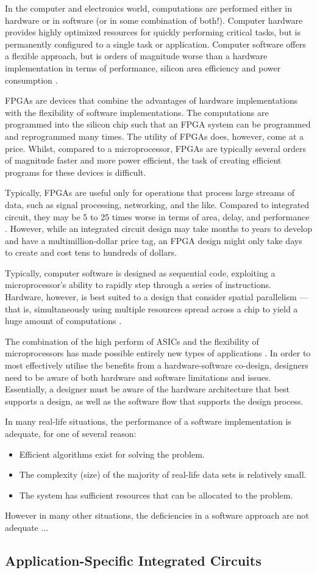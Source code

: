 In the computer and electronics world, computations are performed either in
hardware or in software (or in some combination of both!). Computer hardware
provides highly optimized resources for quickly performing critical tasks, but
is permanently configured to a single task or application. Computer software
offers a flexible approach, but is orders of magnitude worse than a hardware
implementation in terms of performance, silicon area efficiency and power
consumption \cite{Hauck:2007}.

\glspl{FPGA} are devices that combine the advantages of hardware implementations
with the flexibility of software implementations. The computations are
programmed into the silicon chip such that an FPGA system can be programmed and
reprogrammed many times. The utility of FPGAs does, however, come at a price.
Whilst, compared to a microprocessor, FPGAs are typically several orders of
magnitude faster and more power efficient, the task of creating efficient
programs for these devices is difficult.

Typically, \glspl{FPGA} are useful only for operations that process large
streams of data, such as signal processing, networking, and the like. Compared
to integrated circuit, they may be 5 to 25 times worse in terms of area, delay,
and performance \cite{Hauck:2007}. However, while an integrated circuit design
may take months to years to develop and have a multimillion-dollar price tag, an
\gls{FPGA} design might only take days to create and cost tens to hundreds of
dollars.

Typically, computer software is designed as sequential code, exploiting a
microprocessor's ability to rapidly step through a series of instructions.
Hardware, however, is best suited to a design that consider spatial parallelism
--- that is, simultaneously using multiple resources spread across a chip to
yield a huge amount of computations \cite{Hauck:2007}.

The combination of the high perform of \glspl{ASIC} and the flexibility of
microprocessors has made possible entirely new types of applications
\cite{Hauck:2007}. In order to most effectively utilise the benefits from a
hardware-software co-design, designers need to be aware of both hardware and
software limitations and issues. Essentially, a designer must be aware of the
hardware architecture that best supports a design, as well as the software flow
that supports the design process.

In many real-life situations, the performance of a software implementation is
adequate, for one of several reason:
\begin{itemize}
    \item Efficient algorithms exist for solving the problem.
    \item The complexity (size) of the majority of real-life data sets is
        relatively small.
    \item The system has sufficient resources that can be allocated to the
        problem.
\end{itemize}

However in many other situations, the deficiencies in a software approach are
not adequate ...

\subsection{Application-Specific Integrated Circuits}
\label{asic}
